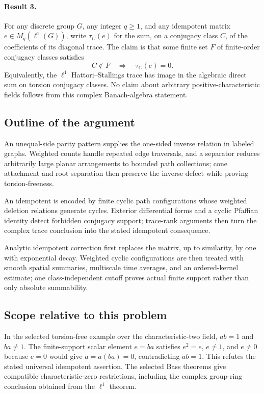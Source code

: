 \documentclass[11pt]{article}
\begin{document}
\paragraph{Result 3.} For any discrete group \(G\), any integer \(q\ge1\), and any idempotent matrix \(e\in M_q(\ell^1(G))\), write \(\tau_C(e)\) for the sum, on a conjugacy class \(C\), of the coefficients of its diagonal trace. The claim is that some finite set \(F\) of finite-order conjugacy classes satisfies
\[
 C\notin F\quad\Longrightarrow\quad\tau_C(e)=0.
\]
Equivalently, the \(\ell^1\) Hattori--Stallings trace has image in the algebraic direct sum on torsion conjugacy classes. No claim about arbitrary positive-characteristic fields follows from this complex Banach-algebra statement.

\subsection{Outline of the argument}
An unequal-side parity pattern supplies the one-sided inverse relation in labeled graphs. Weighted counts handle repeated edge traversals, and a separator reduces arbitrarily large planar arrangements to bounded path collections; cone attachment and root separation then preserve the inverse defect while proving torsion-freeness.

An idempotent is encoded by finite cyclic path configurations whose weighted deletion relations generate cycles. Exterior differential forms and a cyclic Pfaffian identity detect forbidden conjugacy support; trace-rank arguments then turn the complex trace conclusion into the stated idempotent consequence.

Analytic idempotent correction first replaces the matrix, up to similarity, by one with exponential decay. Weighted cyclic configurations are then treated with smooth spatial summaries, multiscale time averages, and an ordered-kernel estimate; one class-independent cutoff proves actual finite support rather than only absolute summability.

\subsection{Scope relative to this problem}
In the selected torsion-free example over the characteristic-two field, $ab=1$ and $ba\ne1$. The finite-support scalar element $e=ba$ satisfies $e^2=e$, $e\ne1$, and $e\ne0$ because $e=0$ would give $a=a(ba)=0$, contradicting $ab=1$. This refutes the stated universal idempotent assertion. The selected Bass theorems give compatible characteristic-zero restrictions, including the complex group-ring conclusion obtained from the $\ell^1$ theorem.
\end{document}
